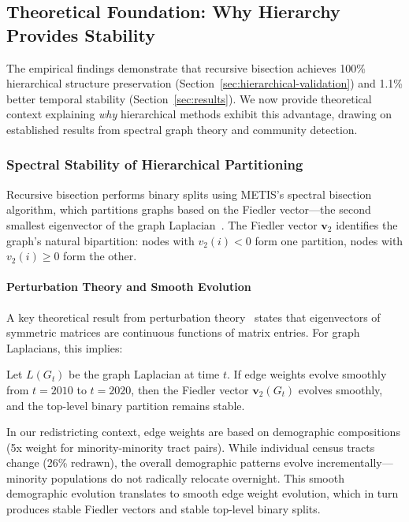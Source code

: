 \subsection{Theoretical Foundation: Why Hierarchy Provides Stability}
\label{sec:theoretical-foundation}

The empirical findings demonstrate that recursive bisection achieves 100\% hierarchical structure preservation (Section~\ref{sec:hierarchical-validation}) and 1.1\% better temporal stability (Section~\ref{sec:results}). We now provide theoretical context explaining \textit{why} hierarchical methods exhibit this advantage, drawing on established results from spectral graph theory and community detection.

\subsubsection{Spectral Stability of Hierarchical Partitioning}

Recursive bisection performs binary splits using METIS's spectral bisection algorithm, which partitions graphs based on the Fiedler vector---the second smallest eigenvector of the graph Laplacian~\citep{fiedler1973algebraic, pothen1990partitioning}. The Fiedler vector $\mathbf{v}_2$ identifies the graph's natural bipartition: nodes with $v_2(i) < 0$ form one partition, nodes with $v_2(i) \geq 0$ form the other.

\paragraph{Perturbation Theory and Smooth Evolution} A key theoretical result from perturbation theory~\citep{davis1970rotation, stewart1990matrix} states that eigenvectors of symmetric matrices are continuous functions of matrix entries. For graph Laplacians, this implies:

\begin{proposition}[Informal]
Let $L(G_t)$ be the graph Laplacian at time $t$. If edge weights evolve smoothly from $t=2010$ to $t=2020$, then the Fiedler vector $\mathbf{v}_2(G_t)$ evolves smoothly, and the top-level binary partition remains stable.
\end{proposition}

In our redistricting context, edge weights are based on demographic compositions (5x weight for minority-minority tract pairs). While individual census tracts change (26\% redrawn), the overall demographic patterns evolve incrementally---minority populations do not radically relocate overnight. This smooth demographic evolution translates to smooth edge weight evolution, which in turn produces stable Fiedler vectors and stable top-level binary splits.

